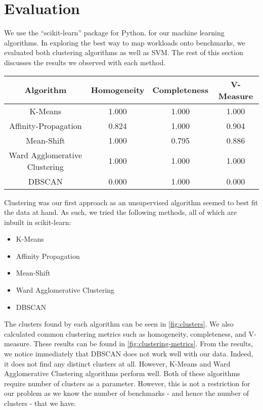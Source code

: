 \section{Evaluation} \label{sec:eval}

We use the ``scikit-learn'' \citep{scikit-learn} package for Python.
for our machine learning algorithms. 
In exploring the best way to map workloads onto benchmarks, we evaluated both
clustering algorithms as well as SVM. The rest of this section discusses the results we
observed with each method.

\begin{figure*}[h]
    \centering
    \begin{tabular}{c c c c}
      \toprule
      Algorithm                     & Homogeneity & Completeness & V-Measure \\
      \midrule
      K-Means                       & 1.000       & 1.000        & 1.000     \\
      Affinity-Propagation          & 0.824       & 1.000        & 0.904     \\
      Mean-Shift                    & 1.000       & 0.795        & 0.886     \\
      Ward Agglomerative Clustering & 1.000       & 1.000        & 1.000     \\
      DBSCAN                        & 0.000       & 1.000        & 0.000     \\
      \bottomrule
    \end{tabular}

    \caption{Clustering Algorithm Performance Metrics}
    \label{fig:clustering-metrics}
\end{figure*}

Clustering was our first approach as an unsupervised algorithm seemed
to best fit the data at hand. As such, we tried the following methods,
all of which are inbuilt in scikit-learn:\\

\begin{itemize}
\item K-Means
\item Affinity Propagation
\item Mean-Shift
\item Ward Agglomerative Clustering
\item DBSCAN
\end{itemize}

The clusters found by each algorithm can be seen in
\ref{fig:clusters}. We also calculated common clustering metrics such
as homogeneity, completeness, and V-measure. These results can be
found in \ref{fig:clustering-metrics}. From the results, we notice
immediately that DBSCAN does not work well with our data. Indeed, it
does not find any distinct clusters at all. However, K-Means and Ward
Agglomerative Clustering algorithms perform well. 
Both of these algorithms require number of clusters as a 
parameter. 
However, this is not a restriction for our problem as we
know the number of benchmarks - and hence the number of clusters -
that we have.

